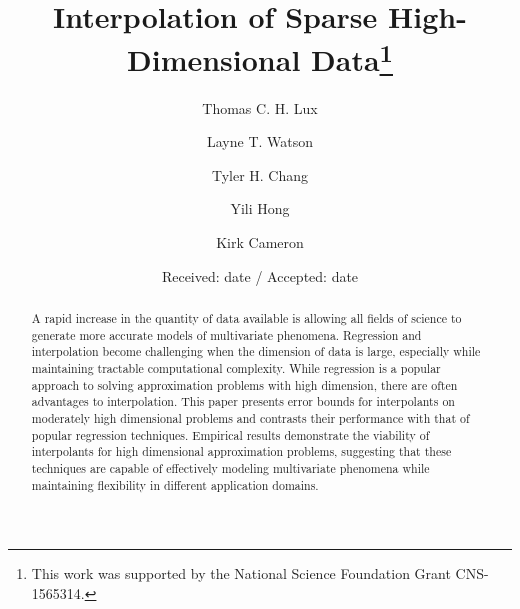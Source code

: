 \documentclass[smallextended,final]{svjour3}       %
\begin{document}
\title{Interpolation of Sparse High-Dimensional Data\thanks
  {This work was supported by the National Science Foundation Grant CNS-1565314.}
}


\author{Thomas C. H. Lux   \and
  Layne T. Watson          \and
  Tyler H. Chang           \and
  Yili Hong                \and
  Kirk Cameron
}



\date{Received: date / Accepted: date}

\maketitle

\begin{abstract}
A rapid increase in the quantity of data available is allowing all fields of science to generate more accurate models of multivariate phenomena. Regression and interpolation become challenging when the dimension of data is large, especially while maintaining tractable computational complexity. While regression is a popular approach to solving approximation problems with high dimension, there are often advantages to interpolation. This paper presents error bounds for interpolants on moderately high dimensional problems and contrasts their performance with that of popular regression techniques. Empirical results demonstrate the viability of interpolants for high dimensional approximation problems, suggesting that these techniques are capable of effectively modeling multivariate phenomena while maintaining flexibility in different application domains.

\end{abstract}

\end{document}
